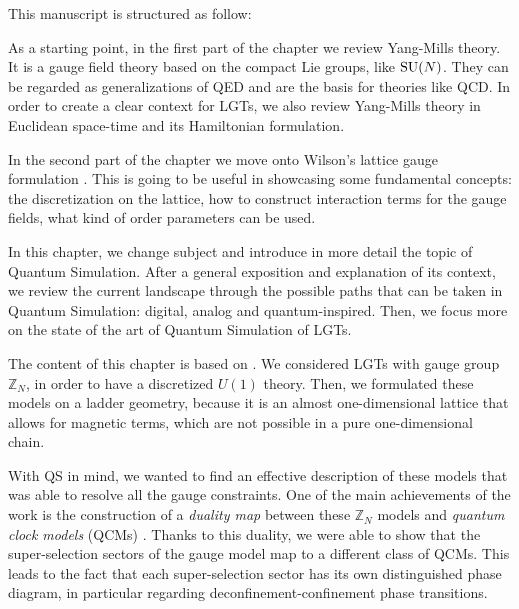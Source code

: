 \noindent This manuscript is structured as follow:
\begin{description}[labelsep=1.1em]
    \item[Chap.~\ref{chap:introduction_to_lattice_gauge_theories}]
        As a starting point, in the first part of the chapter we review Yang-Mills theory.
        It is a gauge field theory based on the compact Lie groups, like $\text{SU}(N)$.
        They can be regarded as generalizations of QED and are the basis for theories like QCD.
        In order to create a clear context for LGTs, we also review Yang-Mills theory in Euclidean space-time and its Hamiltonian formulation.

        In the second part of the chapter we move onto Wilson's lattice gauge formulation \cite{wilson1974confinement}.
        This is going to be useful in showcasing some fundamental concepts: the discretization on the lattice, how to construct interaction terms for the gauge fields, what kind of order parameters can be used.


    \item[Chap.~\ref{chap:quantum_simulation_of_lattice_gauge_theories}]
        In this chapter, we change subject and introduce in more detail the topic of Quantum Simulation.
        After a general exposition and explanation of its context, we review the current landscape through the possible paths that can be taken in Quantum Simulation: digital, analog and quantum-inspired.
        Then, we focus more on the state of the art of Quantum Simulation of LGTs.


    \item[Chap.~\ref{chap:dualities_in_abelian_models}]
        The content of this chapter is based on \cite{pradhan2022ladder}.
        We considered LGTs with gauge group $\mathbb{Z}_N$, in order to have a discretized $U(1)$ theory.
        Then, we formulated these models on a ladder geometry, because it is an almost one-dimensional lattice that allows for magnetic terms, which are not possible in a pure one-dimensional chain.

        With QS in mind, we wanted to find an effective description of these models that was able to resolve all the gauge constraints.
        One of the main achievements of the work is the construction of a \emph{duality map} between these $\mathbb{Z}_N$ models and \emph{quantum clock models} (QCMs) \cite{ortiz2012dualities}.
        Thanks to this duality, we were able to show that the super-selection sectors of the gauge model map to a different class of QCMs.
        This leads to the fact that each super-selection sector has its own distinguished phase diagram, in particular regarding deconfinement-confinement phase transitions.



\end{description}
